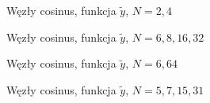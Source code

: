 \documentclass[a4paper,11pt]{article}
\begin{document}
\begin{figure}[h]
    \begin{center}
                
    \end{center}
    \caption{Węzły cosinus, funkcja \(\tilde{y}\), \(N=2,4\)}
\end{figure}

\begin{figure}[h]
    \begin{center}
                
    \end{center}
    \caption{Węzły cosinus, funkcja \(\tilde{y}\), \(N=6,8,16,32\)}
\end{figure}

\begin{figure}[h]
    \begin{center}
                
    \end{center}
    \caption{Węzły cosinus, funkcja \(\tilde{y}\), \(N=6,64\)}
\end{figure}

\begin{figure}[h]
    \begin{center}
                
    \end{center}
    \caption{Węzły cosinus, funkcja \(\tilde{y}\), \(N=5,7,15,31\)}
\end{figure}
\end{document}
